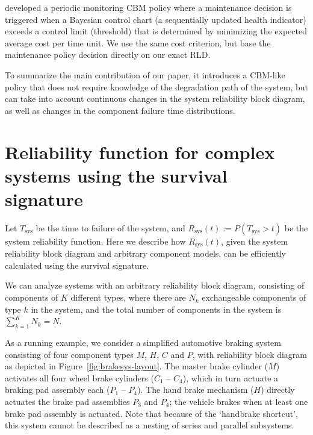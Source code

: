 \documentclass[authoryear]{elsarticle}
\newcommand{\Tsys}{T_\text{sys}}
\newcommand{\Rsys}{R_\text{sys}}
\def\tnow{t_\text{now}}
\newcommand{\Rsysnow}{R^{(t_\text{now})}_\text{sys}}
\begin{document}
\citet{2011:kim-et-al} developed a periodic monitoring CBM policy
where a maintenance decision is triggered when a Bayesian control chart
(a sequentially updated health indicator) exceeds a control limit (threshold)
that is determined by minimizing the expected average cost per time unit.
We use the same cost criterion, but base the maintenance policy decision directly on our exact RLD.

To summarize the main contribution of our paper,
it introduces a CBM-like policy that does not require knowledge of the degradation path of the system,
but can take into account continuous changes in the system reliability block diagram,
as well as changes in the component failure time distributions.



\section{Reliability function for complex systems using the survival signature}
\label{sec:sysrel}

Let $\Tsys$ be the time to failure of the system,
and $\Rsys(t) := P(\Tsys > t)$ be the system reliability function.
Here we describe how $\Rsys(t)$, given the system reliability block diagram and arbitrary component models,
can be efficiently calculated using the survival signature.

We can analyze systems with an arbitrary reliability block diagram,
consisting of components of $K$ different types,
where there are $N_k$ exchangeable components of type $k$ in the system,
and the total number of components in the system is $\sum_{k=1}^K N_k = N$.

As a running example, we consider a simplified automotive braking system
consisting of four component types $M$, $H$, $C$ and $P$,
with reliability block diagram as depicted in Figure~\ref{fig:brakesys-layout}.
The master brake cylinder ($M$) activates all four wheel brake cylinders ($C_1$ -- $C_4$),
which in turn actuate a braking pad assembly each ($P_1$ -- $P_4$).
The hand brake mechanism ($H$) directly actuates the brake pad assemblies $P_3$ and $P_4$;
the vehicle brakes when at least one brake pad assembly is actuated.
Note that because of the `handbrake shortcut', this system cannot be described as a nesting of series and parallel subsystems.
\end{document}
